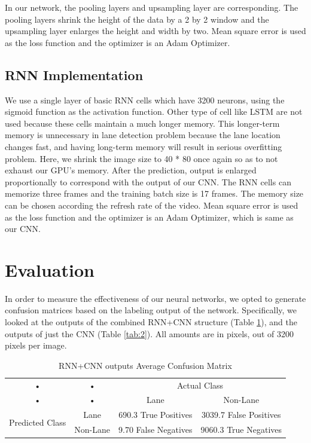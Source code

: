 \documentclass[runningheads]{llncs}
\begin{document}
In our network, the pooling layers and upsampling layer are corresponding. The pooling layers shrink the height of the data by a 2 by 2 window and the upsampling layer enlarges the height and width by two. Mean square error is used as the loss function and the optimizer is an Adam Optimizer.

\subsection{RNN Implementation}
We use a single layer of basic RNN cells which have 3200 neurons, using the sigmoid function as the activation function. Other type of cell like LSTM are not used because these cells maintain a much longer memory. This longer-term memory is unnecessary in lane detection problem because the lane location changes fast, and having long-term memory will result in serious overfitting problem.  Here, we shrink the image size to 40 * 80 once again so as to not exhaust our GPU's memory. After the prediction, output is enlarged proportionally to correspond with the output of our CNN. The RNN cells can memorize three frames and the training batch size is 17 frames. The memory size can be chosen according the refresh rate of the video. Mean square error is used as the loss function and the optimizer is an Adam Optimizer, which is same as our CNN.

\section{Evaluation}
In order to measure the effectiveness of our neural networks, we opted to generate confusion matrices based on the labeling output of the network. Specifically, we looked at the outputs of the combined RNN+CNN structure (Table \ref{tab:1}), and the outputs of just the CNN (Table \ref{tab:2}). All amounts are in pixels, out of 3200 pixels per image.

\setlength\tabcolsep{4pt}

\begin{table}[h]
\centering
\caption{RNN+CNN outputs Average Confusion Matrix}\label{tab:1}
\begin{tabular}{cccc}
\cline{3-4}
• & • & \multicolumn{2}{c}{Actual Class} \\
• & • & Lane & Non-Lane \\ 
\hline 
\multirow{2}{*}{Predicted Class} & Lane & 690.3 True Positives & 3039.7 False Positives \\ 
• & Non-Lane & 9.70 False Negatives & 9060.3 True Negatives \\ 
\hline 
\end{tabular} 
\end{table}
\end{document}
